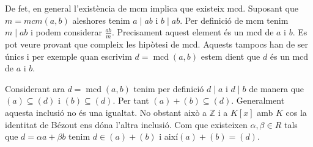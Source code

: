 \documentclass[a4paper,11pt]{report}
\DeclareMathOperator{\mcd}{mcd}
\theoremstyle{theorem}
\theoremstyle{definition}
\begin{document}
De fet, en general l'existència de mcm implica que existeix mcd. Suposant que $m=mcm(a,b)$ aleshores tenim $a\mid ab$ i $b\mid ab$. Per definició de mcm tenim $m\mid ab$ i podem considerar $\tfrac{ab}{m}$. Precisament aquest element és un mcd de $a$ i $b$. Es pot veure provant que compleix les hipòtesi de mcd. Aquests tampocs han de ser únics i per exemple quan escrivim $d=\mcd(a,b)$ estem dient que $d$ és un mcd de $a$ i $b$.

Considerant ara $d=\mcd(a,b)$ tenim per definició $d\mid a$ i $d\mid b$ de manera que $(a)\subseteq (d)$ i $(b)\subseteq(d)$. Per tant $(a)+(b)\subseteq (d)$. Generalment aquesta inclusió no és una igualtat. No obstant això a $\mathbb{Z}$ i a $K[x]$ amb $K$ cos la identitat de Bézout ens dóna l'altra inclusió. Com que existeixen $\alpha,\beta\in R$ tals que $d=\alpha a+\beta b$ tenim $d\in (a)+(b)$ i així$(a)+(b)= (d)$.
\end{document}
